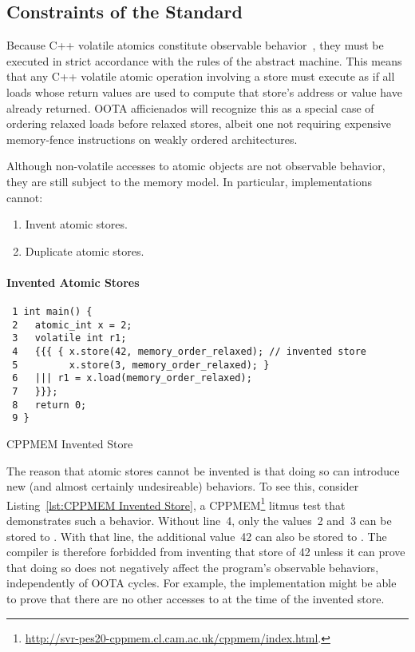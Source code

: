\documentclass[10]{article}
\begin{document}
\subsection{Constraints of the Standard}
\label{sec:Constraints of the Standard}

Because C++ volatile atomics constitute observable
behavior~\cite[]{ThomasKoeppe2022N4910},
they must be executed in strict accordance with the rules of the abstract
machine.
This means that any C++ volatile atomic operation involving a store
must execute as if all loads whose return values are used to compute
that store's address or value have already returned.
OOTA afficienados will recognize this as a special case of ordering
relaxed loads before relaxed stores, albeit one not requiring
expensive memory-fence instructions on weakly ordered architectures.

Although non-volatile accesses to atomic objects are not observable behavior,
they are still subject to the memory model.
In particular, implementations cannot:

\begin{enumerate}
\item	Invent atomic stores.
\item	Duplicate atomic stores.
\end{enumerate}

\paragraph{Invented Atomic Stores}

\begin{listing}[tbp]
\begin{verbatim}
 1 int main() {
 2   atomic_int x = 2;
 3   volatile int r1;
 4   {{{ { x.store(42, memory_order_relaxed); // invented store
 5         x.store(3, memory_order_relaxed); }
 6   ||| r1 = x.load(memory_order_relaxed);
 7   }}};
 8   return 0;
 9 }
\end{verbatim}
\caption{CPPMEM Invented Store}
\label{lst:CPPMEM Invented Store}
\end{listing}

The reason that atomic stores cannot be invented is that doing so can
introduce new (and almost certainly undesireable) behaviors.
To see this, consider Listing~\ref{lst:CPPMEM Invented Store},
a CPPMEM\footnote{
	\url{http://svr-pes20-cppmem.cl.cam.ac.uk/cppmem/index.html}.}
litmus test that demonstrates such a behavior.
Without line~4, only the values~2 and~3 can be stored to .
With that line, the additional value~42 can also be stored to .
The compiler is therefore forbidded from inventing that store of 42
unless it can prove that doing so does not negatively affect the
program's observable behaviors, independently of OOTA cycles.
For example, the implementation might be able to prove that there
are no other accesses to  at the time of the invented store.
\end{document}
